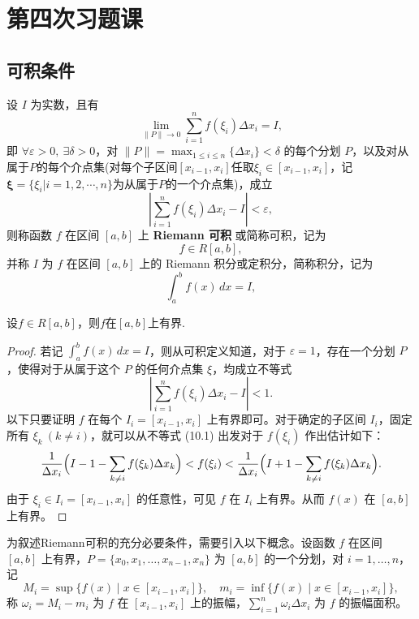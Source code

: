 \documentclass[lang=cn,12pt]{elegantbook}
\begin{document}
\chapter{第四次习题课}
\section{可积条件}

\begin{definition}[Riemann 可积]
    设 \( I \) 为实数，且有
\[
\lim_{\|P\| \to 0} \sum_{i=1}^n f(\xi_i) \Delta x_i = I,
\]
即 \(\forall \varepsilon > 0,\ \exists \delta > 0\)，对 \(\|P\|  = \max_{1 \leq i \leq n} \{\Delta x_i\}< \delta\) 的每个分划 \(P\)，以及对从属于$P$的每个介点集(对每个子区间$[x_{i-1},x_i]$任取$\xi_i \in [x_{i-1},x_i]$，记$\mathbf{\xi} = \{\xi_i|i = 1,2,\cdots,n\}$为从属于$P$的一个介点集)，成立
\[
\left| \sum_{i=1}^n f(\xi_i) \Delta x_i - I \right| < \varepsilon,
\]
则称函数 \( f \) 在区间 \([a, b]\) 上 \textbf{Riemann 可积} 或简称可积，记为
\[
f \in R[a, b],
\]
并称 \( I \) 为 \( f \) 在区间 \([a, b]\) 上的 Riemann 积分或定积分，简称积分，记为
\[
\int_a^b f(x) \, dx = I,
\]
\end{definition}


\begin{theorem}[Riemann可积的必要条件]
    设$f \in R[a,b]$，则$f$在$[a,b]$上有界.
\end{theorem}

\begin{proof}
    若记 \(\displaystyle \int_a^b f(x) \, dx = I\)，则从可积定义知道，对于 \(\varepsilon = 1\)，存在一个分划 \(P\)，使得对于从属于这个 \(P\) 的任何介点集 \(\xi\)，均成立不等式
\[
\left| \sum_{i=1}^n f(\xi_i) \Delta x_i - I \right| < 1. \tag{10.1}
\]
以下只要证明 \(f\) 在每个 \(I_i = [x_{i-1}, x_i]\) 上有界即可。对于确定的子区间 \(I_i\)，固定所有 \(\xi_k\ (k \neq i)\)，就可以从不等式 (10.1) 出发对于 \(f(\xi_i)\) 作出估计如下：
\[
\frac{1}{\Delta x_i} \Bigl( I - 1 - \sum_{k \neq i} f(\xi_k) \Delta x_k \Bigr) < f(\xi_i) < \frac{1}{\Delta x_i} \Bigl( I + 1 - \sum_{k \neq i} f(\xi_k) \Delta x_k \Bigr).
\]
由于 \(\xi_i \in I_i = [x_{i-1}, x_i]\) 的任意性，可见 \(f\) 在 \(I_i\) 上有界。从而 \(f(x)\) 在 \([a, b]\) 上有界。
\end{proof}

为叙述Riemann可积的充分必要条件，需要引入以下概念。设函数 \(f\) 在区间 \([a, b]\) 上有界，\(P = \{x_0, x_1, \dots, x_{n-1}, x_n\}\) 为 \([a, b]\) 的一个分划，对 \(i = 1, \dots, n\)，记
\[
M_i = \sup\{f(x) \mid x \in [x_{i-1}, x_i]\},\quad
m_i = \inf\{f(x) \mid x \in [x_{i-1}, x_i]\},
\]
称 \(\omega_i = M_i - m_i\) 为 \(f\) 在 \([x_{i-1}, x_i]\) 上的振幅，\(\displaystyle \sum_{i=1}^n \omega_i \Delta x_i\) 为 \(f\) 的振幅面积。
\end{document}
